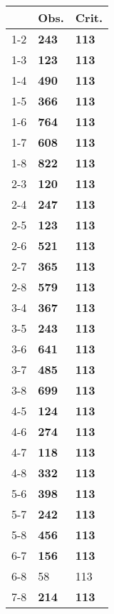 \begin{table}[ht]
\centering
\begin{tabular}{rll}
  \hline
 & Obs. & Crit. \\ 
  \hline
1-2 & \textbf{243} & \textbf{113} \\ 
  1-3 & \textbf{123} & \textbf{113} \\ 
  1-4 & \textbf{490} & \textbf{113} \\ 
  1-5 & \textbf{366} & \textbf{113} \\ 
  1-6 & \textbf{764} & \textbf{113} \\ 
  1-7 & \textbf{608} & \textbf{113} \\ 
  1-8 & \textbf{822} & \textbf{113} \\ 
  2-3 & \textbf{120} & \textbf{113} \\ 
  2-4 & \textbf{247} & \textbf{113} \\ 
  2-5 & \textbf{123} & \textbf{113} \\ 
  2-6 & \textbf{521} & \textbf{113} \\ 
  2-7 & \textbf{365} & \textbf{113} \\ 
  2-8 & \textbf{579} & \textbf{113} \\ 
  3-4 & \textbf{367} & \textbf{113} \\ 
  3-5 & \textbf{243} & \textbf{113} \\ 
  3-6 & \textbf{641} & \textbf{113} \\ 
  3-7 & \textbf{485} & \textbf{113} \\ 
  3-8 & \textbf{699} & \textbf{113} \\ 
  4-5 & \textbf{124} & \textbf{113} \\ 
  4-6 & \textbf{274} & \textbf{113} \\ 
  4-7 & \textbf{118} & \textbf{113} \\ 
  4-8 & \textbf{332} & \textbf{113} \\ 
  5-6 & \textbf{398} & \textbf{113} \\ 
  5-7 & \textbf{242} & \textbf{113} \\ 
  5-8 & \textbf{456} & \textbf{113} \\ 
  6-7 & \textbf{156} & \textbf{113} \\ 
  6-8 & 58 & 113 \\ 
  7-8 & \textbf{214} & \textbf{113} \\ 
   \hline
\end{tabular}
\end{table}
